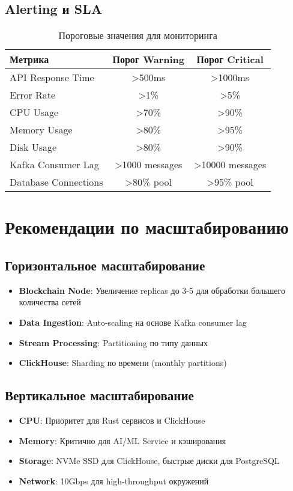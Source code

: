 \documentclass[11pt,a4paper]{article}
\begin{document}
\subsection{Alerting и SLA}

\begin{table}[H]
\centering
\small
\begin{tabular}{|l|c|c|}
\hline
\textbf{Метрика} & \textbf{Порог Warning} & \textbf{Порог Critical} \\
\hline
API Response Time & >500ms & >1000ms \\
Error Rate & >1\% & >5\% \\
CPU Usage & >70\% & >90\% \\
Memory Usage & >80\% & >95\% \\
Disk Usage & >80\% & >90\% \\
Kafka Consumer Lag & >1000 messages & >10000 messages \\
Database Connections & >80\% pool & >95\% pool \\
\hline
\end{tabular}
\caption{Пороговые значения для мониторинга}
\end{table}

\section{Рекомендации по масштабированию}

\subsection{Горизонтальное масштабирование}

\begin{itemize}
    \item \textbf{Blockchain Node}: Увеличение replicas до 3-5 для обработки большего количества сетей
    \item \textbf{Data Ingestion}: Auto-scaling на основе Kafka consumer lag
    \item \textbf{Stream Processing}: Partitioning по типу данных
    \item \textbf{ClickHouse}: Sharding по времени (monthly partitions)
\end{itemize}

\subsection{Вертикальное масштабирование}

\begin{itemize}
    \item \textbf{CPU}: Приоритет для Rust сервисов и ClickHouse
    \item \textbf{Memory}: Критично для AI/ML Service и кэширования
    \item \textbf{Storage}: NVMe SSD для ClickHouse, быстрые диски для PostgreSQL
    \item \textbf{Network}: 10Gbps для high-throughput окружений
\end{itemize}
\end{document}
